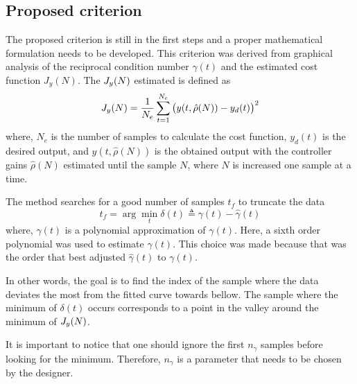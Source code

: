 \subsection{Proposed criterion}

The proposed criterion is still in the first steps and a proper mathematical formulation needs to be developed.
This criterion was derived from graphical analysis of the reciprocal condition number $\gamma(t)$ and the estimated cost function $J_y(N)$.
The $J_y(N)$ estimated is defined as
\begin{equation}
	J_y(N) = \frac{1}{N_e} \sum \limits_{t=1}^{N_e} \left( y(t, \hat{\rho}(N)) - y_d(t) \right)^2
\label{eq:jy}
\end{equation}
where, $N_e$ is the number of samples to calculate the cost function, $y_d(t)$ is the desired output, and $y(t, \hat{\rho}(N))$ is the obtained output with the controller gains $\hat{\rho}(N)$ estimated until the sample $N$, where $N$ is increased one sample at a time.

The method searches for a good number of samples $t_f$ to truncate the data
\begin{equation}
	t_f = \arg \min_t \delta(t) \triangleq \gamma(t) - \hat{\gamma}(t)
\label{eq:proposed_method}
\end{equation}
where, $\hat{\gamma}(t)$ is a polynomial approximation of $\gamma(t)$.
Here, a sixth order polynomial was used to estimate $\hat{\gamma}(t)$.
This choice was made because that was the order that best adjusted $\hat{\gamma}(t)$ to $\gamma(t)$.

In other words, the goal is to find the index of the sample where the data deviates the most from the fitted curve towards bellow.
The sample where the minimum of $\delta(t)$ occurs corresponds to a point in the valley around the minimum of $J_y(N)$.

It is important to notice that one should ignore the first $n_\gamma$ samples before looking for the minimum.
Therefore, $n_\gamma$ is a parameter that needs to be chosen by the designer.
